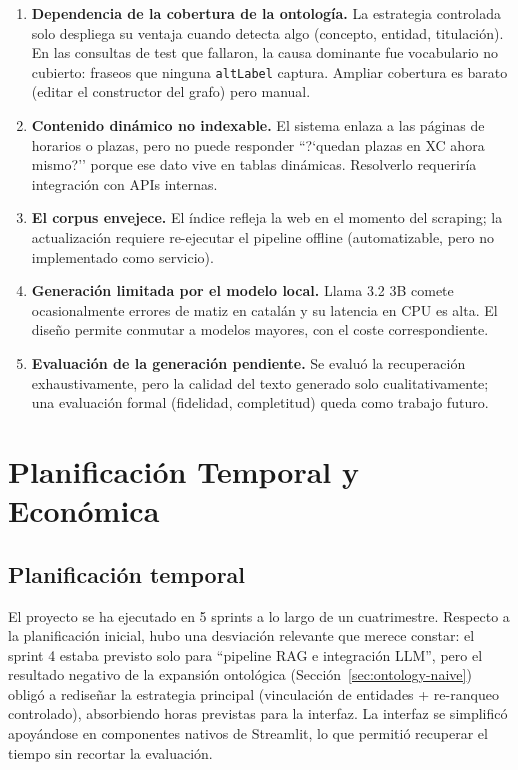 \documentclass[12pt, a4paper, twoside]{report}
\begin{document}
\begin{enumerate}
  \item \textbf{Dependencia de la cobertura de la ontolog\'ia.} La estrategia controlada solo despliega su ventaja cuando detecta algo (concepto, entidad, titulaci\'on). En las consultas de test que fallaron, la causa dominante fue vocabulario no cubierto: fraseos que ninguna \texttt{altLabel} captura. Ampliar cobertura es barato (editar el constructor del grafo) pero manual.
  \item \textbf{Contenido din\'amico no indexable.} El sistema enlaza a las p\'aginas de horarios o plazas, pero no puede responder ``?`quedan plazas en XC ahora mismo?'' porque ese dato vive en tablas din\'amicas. Resolverlo requerir\'ia integraci\'on con APIs internas.
  \item \textbf{El corpus envejece.} El \'indice refleja la web en el momento del scraping; la actualizaci\'on requiere re-ejecutar el pipeline offline (automatizable, pero no implementado como servicio).
  \item \textbf{Generaci\'on limitada por el modelo local.} Llama 3.2 3B comete ocasionalmente errores de matiz en catal\'an y su latencia en CPU es alta. El dise\~no permite conmutar a modelos mayores, con el coste correspondiente.
  \item \textbf{Evaluaci\'on de la generaci\'on pendiente.} Se evalu\'o la recuperaci\'on exhaustivamente, pero la calidad del texto generado solo cualitativamente; una evaluaci\'on formal (fidelidad, completitud) queda como trabajo futuro.
\end{enumerate}

\chapter{Planificaci\'on Temporal y Econ\'omica}
\label{ch:planificacion}

\section{Planificaci\'on temporal}

El proyecto se ha ejecutado en 5 sprints a lo largo de un cuatrimestre. Respecto a la planificaci\'on inicial, hubo una desviaci\'on relevante que merece constar: el sprint 4 estaba previsto solo para ``pipeline RAG e integraci\'on LLM'', pero el resultado negativo de la expansi\'on ontol\'ogica (Secci\'on~\ref{sec:ontology-naive}) oblig\'o a redise\~nar la estrategia principal (vinculaci\'on de entidades + re-ranqueo controlado), absorbiendo horas previstas para la interfaz. La interfaz se simplific\'o apoy\'andose en componentes nativos de Streamlit, lo que permiti\'o recuperar el tiempo sin recortar la evaluaci\'on.
\end{document}
